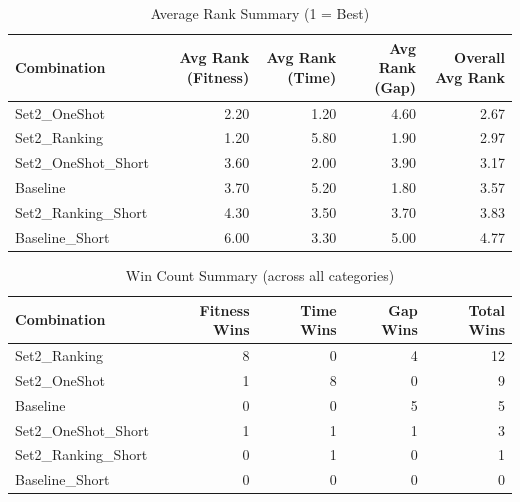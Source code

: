 \documentclass{article}
\begin{document}
\begin{table}[htbp]
\centering
\caption{Average Rank Summary (1 = Best)}
\label{tab:avg_rank_summary}
\begin{tabular}{lrrrr}
\toprule
Combination & Avg Rank (Fitness) & Avg Rank (Time) & Avg Rank (Gap) & Overall Avg Rank \\
\midrule
Set2\_OneShot & 2.20 & 1.20 & 4.60 & 2.67 \\
Set2\_Ranking & 1.20 & 5.80 & 1.90 & 2.97 \\
Set2\_OneShot\_Short & 3.60 & 2.00 & 3.90 & 3.17 \\
Baseline & 3.70 & 5.20 & 1.80 & 3.57 \\
Set2\_Ranking\_Short & 4.30 & 3.50 & 3.70 & 3.83 \\
Baseline\_Short & 6.00 & 3.30 & 5.00 & 4.77 \\
\bottomrule
\end{tabular}
\end{table}

\begin{table}[htbp]
\centering
\caption{Win Count Summary (across all categories)}
\label{tab:win_count_summary}
\begin{tabular}{lrrrr}
\toprule
Combination & Fitness Wins & Time Wins & Gap Wins & Total Wins \\
\midrule
Set2\_Ranking & 8 & 0 & 4 & 12 \\
Set2\_OneShot & 1 & 8 & 0 & 9 \\
Baseline & 0 & 0 & 5 & 5 \\
Set2\_OneShot\_Short & 1 & 1 & 1 & 3 \\
Set2\_Ranking\_Short & 0 & 1 & 0 & 1 \\
Baseline\_Short & 0 & 0 & 0 & 0 \\
\bottomrule
\end{tabular}
\end{table}
\end{document}
